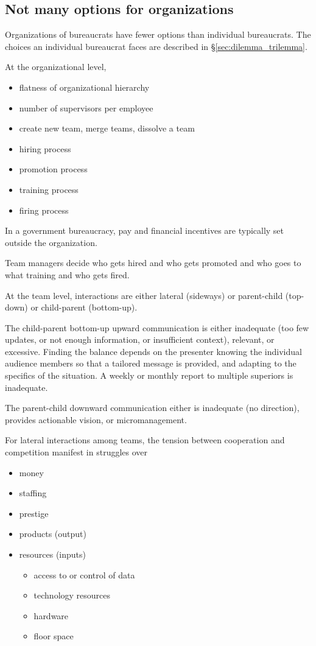 \subsection{Not many options for organizations}

Organizations of bureaucrats have fewer options than individual bureaucrats. The choices an individual bureaucrat faces are described in \S\ref{sec:dilemma_trilemma}.

At the organizational level, 
\begin{itemize}
    \item flatness of organizational hierarchy
    \item number of supervisors per employee
    \item create new team, merge teams, dissolve a team
    \item hiring process 
    \item promotion process 
    \item training process
    \item firing process
\end{itemize}
In a government bureaucracy, pay and financial incentives are typically set outside the organization.


Team managers decide who gets hired and who gets promoted and who goes to what training and who gets fired.

At the team level, interactions are either lateral (sideways) or parent-child (top-down) or child-parent (bottom-up).
\cite{2014_Jorgensen}

The child-parent bottom-up upward communication is either inadequate (too few updates, or not enough information, or insufficient context), relevant, or excessive. Finding the balance depends on the presenter knowing the individual audience members so that a tailored message is provided, and adapting to the specifics of the situation. A weekly or monthly report to multiple superiors is inadequate. 

The parent-child downward communication either is inadequate (no direction), provides actionable vision, or micromanagement. 

For lateral interactions among teams, the tension between cooperation and competition manifest in struggles over
\begin{itemize}
    \item money
    \item staffing
    \item prestige
    \item products (output)
    \item resources (inputs)
    \begin{itemize}
        \item access to or control of data
        \item technology resources
        \item hardware
        \item floor space
    \end{itemize}
\end{itemize}
